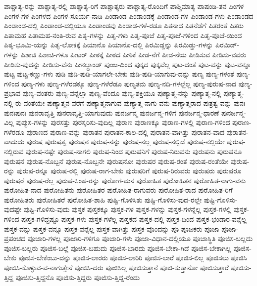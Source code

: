 {ಪಾಶ್ಚಾತ್ಯ-ರನ್ನು
ಪಾಶ್ಚಾತ್ಯ-ರಲ್ಲಿ
ಪಾಶ್ಚಾತ್ಯ-ರಿಗೆ
ಪಾಶ್ಚಾತ್ಯರು
ಪಾಶ್ಚಾತ್ಯ-ರೊಂದಿಗೆ
ಪಾಶ್ಚಿಮಾತ್ಯ
ಪಾಷಂಡಿ-ತನ
ಪಿಂಗಳ
ಪಿಂಗಳ-ಗಳ
ಪಿಂಗಳದ
ಪಿಂಗಳ-ಸೂರ್ಯ-ನಾಡಿ
ಪಿಂಡಾಂಡ
ಪಿಂಡಾಂಡಕ್ಕೆ
ಪಿಂಡಾಂಡ-ಗಳ
ಪಿಂಡಾಂಡ-ಗಳು
ಪಿಂಡಾಂಡದ
ಪಿಂಡಾಂಡ-ದಲ್ಲಿ
ಪಿಂಡಾಂಡ-ದಲ್ಲಿಯೂ
ಪಿಂಡಾಂಡವು
ಪಿಂಡಾಡ-ಗಳೆ-ರಡೂ
ಪಿತನಾದ
ಪಿತನೆಡೆಗೆ
ಪಿತರಂತೆ
ಪಿತರು
ಪಿತಾಮಹ
ಪಿತಾಮಹ-ನಂತಿ-ರುವ
ಪಿತೃ-ಗಳನ್ನು
ಪಿತೃ-ಗಳು
ಪಿತೃ-ಪೂಜೆ
ಪಿತೃ-ಪೂಜೆ-ಗಳಿಂದ
ಪಿತೃ-ಪೂಜೆ-ಯಿಂದ
ಪಿತೃ-ಭೂಮಿ-ಯನ್ನು
ಪಿತೃ-ಲೋಕಕ್ಕೆ
ಪಿಯಾನೊ
ಪಿಯಾನೊ-ದಲ್ಲಿ
ಪಿರಮಿಡ್ಡನ್ನು
ಪಿರಮಿಡ್ಡು-ಗಳನ್ನು
ಪಿರಮಿಡ್-ಗಳನ್ನು
ಪಿಶಾಚಿ
ಪಿಶಾಚಿ-ಗಳೂ
ಪೀಟರ್
ಪೀಠಕ್ಕೆ
ಪೀಠದ
ಪೀಠಿಕೆ
ಪೀಡ-ನೆಗೆ
ಪೀಡ-ನೆಯ
ಪೀಡಿಸುವ
ಪೀಡಿಸು-ವವರು
ಪೀಡಿಸು-ವುದನ್ನು
ಪೀಡಿಸು-ವೆನು
ಪೀನಲ್ಗ್ರಾಂಡ್
ಪುಂಜ-ದಿಂದ
ಪುಕ್ಕದ
ಪುಕ್ಕವೆಲ್ಲ
ಪುಟ-ದಂತೆ
ಪುಟ-ವನ್ನು
ಪುಟ-ವನ್ನೂ
ಪುಟ್ಟ
ಪುಟ್ಟ-ಕಣ್ಣು-ಗಳು
ಪುಡಿ
ಪುಡಿ-ಪುಡಿ-ಯಾಗಲೇ-ಬೇಕು
ಪುಡಿ-ಪುಡಿ-ಯಾಗುವು-ದನ್ನು
ಪುಣ್ಯ
ಪುಣ್ಯ-ಗಳಂತೆ
ಪುಣ್ಯ-ಗಳಿಂದ
ಪುಣ್ಯ-ಗಳು
ಪುಣ್ಯ-ಗಳೆರಡಕ್ಕೂ
ಪುಣ್ಯ-ಗಳೆರೆಡೂ
ಪುಣ್ಯತಮ
ಪುಣ್ಯ-ನದಿ-ಗಳಲ್ಲೆಲ್ಲ
ಪುಣ್ಯ-ಪುರುಷ-ನಾದ
ಪುಣ್ಯ-ಪ್ರಭಾವ
ಪುಣ್ಯ-ವಂತರು
ಪುಣ್ಯ-ವನ್ನೆಲ್ಲಾ
ಪುಣ್ಯ-ವೆಂದೂ
ಪುಣ್ಯ-ಶಕ್ತಿಯೂ
ಪುಣ್ಯಾತ್ಮ-ನನ್ನು
ಪುಣ್ಯಾತ್ಮ-ನಲ್ಲಿ
ಪುಣ್ಯಾತ್ಮ-ನಲ್ಲಿ-ರು-ವಂತೆಯೇ
ಪುಣ್ಯಾತ್ಮನ-ವರೆಗೆ
ಪುಣ್ಯಾತ್ಮನಾಗುವ
ಪುಣ್ಯಾತ್ಮ-ನಾಗು-ವನು
ಪುಣ್ಯಾತ್ಮರಾದ
ಪುತ್ರತ್ವ-ವನ್ನು
ಪುನಃ
ಪುನಃಪುನಃ
ಪುನರಾವೃತ್ತಿ
ಪುನರಾವೃತ್ತಿ-ಯಾಗುವುದು
ಪುನರ್ಜನ್ಮ
ಪುನರ್ಜನ್ಮ-ಗಳಿಗೆ
ಪುನರ್ಜನ್ಮ-ಧಾರಣೆ
ಪುನರ್ಜನ್ಮ-ವಿಲ್ಲ
ಪುಪ್ಪುಸ-ಗಳನ್ನು
ಪುರಸತ್ತು
ಪುರಸ್ಕರಿಸು-ವುದಿಲ್ಲ
ಪುರಾಣ
ಪುರಾಣಕ್ಕೂ
ಪುರಾಣ-ಗಳಲ್ಲಿ
ಪುರಾಣ-ಗಳಿಂದ
ಪುರಾಣ-ಗಳೆರಡೂ
ಪುರಾಣದ
ಪುರಾಣ-ವನ್ನು
ಪುರಾತನ
ಪುರಾತನ-ಕಾಲ-ದಲ್ಲಿ
ಪುರಾತನ-ವಾಗಿತ್ತು
ಪುರಾತನ-ವಾದ
ಪುರಾತನ-ವಾದುದು
ಪುರುಷ
ಪುರುಷತ್ವ
ಪುರುಷನ
ಪುರುಷ-ನನ್ನು
ಪುರುಷ-ನಲ್ಲ
ಪುರುಷ-ನಲ್ಲಿದೆ
ಪುರುಷ-ನಲ್ಲಿಯೇ
ಪುರುಷ-ನಲ್ಲಿರುವ
ಪುರುಷ-ನಷ್ಟೇ
ಪುರುಷ-ನಾಗಲಿ
ಪುರುಷ-ನಿಂದ
ಪುರುಷನಿಗೆ
ಪುರುಷ-ನಿರುವನು
ಪುರುಷನು
ಪುರುಷನೂ
ಪುರುಷನೆ
ಪುರುಷ-ನೊಬ್ಬನೆ
ಪುರುಷ-ನೊಬ್ಬನೇ
ಪುರುಷನೋ
ಪುರುಷರ
ಪುರುಷ-ರಂತೆ
ಪುರುಷ-ರಂತೆಯೇ
ಪುರುಷ-ರನ್ನು
ಪುರುಷ-ರನ್ನೂ
ಪುರುಷ-ರಲ್ಲಿ
ಪುರುಷ-ರಾಗ-ಬೇಕು
ಪುರುಷರಿಗೆ
ಪುರುಷ-ರಿರುವರು
ಪುರುಷರು
ಪುರುಷರೂ
ಪುರುಷರೆ
ಪುರುಷ-ರೆಲ್ಲ
ಪುರುಷ-ಸಿಂಹ-ರನ್ನು
ಪುರೋಗ-ಮನ
ಪುರೋಹಿತ
ಪುರೋಹಿತನ
ಪುರೋಹಿತ-ನಾಗು-ವನು
ಪುರೋಹಿತ-ನಾದ
ಪುರೋಹಿತನು
ಪುರೋಹಿತರ
ಪುರೋಹಿತ-ರಾಗುವರು
ಪುರೋಹಿತ-ರಾದ
ಪುರೋಹಿತ-ರಿಗೆ
ಪುರೋಹಿತರು
ಪುರೋಹಿತರೆ
ಪುರೋಹಿತ-ಶಾಹಿ
ಪುಷ್ಟಿ-ಗೊಳಿಸಿತು
ಪುಷ್ಟಿ-ಗೊಳಿಸು-ವುದ-ರಲ್ಲೇ
ಪುಷ್ಟಿ-ಗೊಳಿಸು-ವುದಷ್ಟೇ
ಪುಷ್ಟಿ-ಗೊಳಿಸು-ವುದು
ಪುಸ್ತಕ
ಪುಸ್ತಕಕ್ಕೂ
ಪುಸ್ತಕ-ಗಳ
ಪುಸ್ತಕ-ಗಳನ್ನು
ಪುಸ್ತಕ-ಗಳನ್ನೆಲ್ಲ
ಪುಸ್ತಕ-ಗಳಲ್ಲಿ
ಪುಸ್ತಕ-ಗಳಿಂದ
ಪುಸ್ತಕ-ಗಳಿದ್ದಷ್ಟೂ
ಪುಸ್ತಕ-ಗಳು
ಪುಸ್ತಕ-ಗಳೆಲ್ಲ
ಪುಸ್ತಕದ
ಪುಸ್ತಕ-ದಲ್ಲಿ
ಪುಸ್ತಕ-ದಿಂದ
ಪುಸ್ತಕ-ಭಂಡಾರ-ವನ್ನೆಲ್ಲ
ಪುಸ್ತಕ-ವನ್ನು
ಪುಸ್ತಕ-ವನ್ನೂ
ಪುಸ್ತಕ-ವನ್ನೆಲ್ಲ
ಪುಸ್ತಕ-ವಾಗಿತ್ತು
ಪುಸ್ತಕ-ವೊಂದನ್ನು
ಪೂ
ಪೂಜಕರು
ಪೂಜಾ
ಪೂಜಾ-ಪ್ರಪಂಚದ
ಪೂಜಾರಿ-ಗಳಲ್ಲ
ಪೂಜಾರಿ-ಗಳಿಗೂ
ಪೂಜಾರಿ-ಗಳು
ಪೂಜಾ-ವಿಧಾನ-ದಲ್ಲಿಯೂ
ಪೂಜಾಸ್ಥಿತಿ
ಪೂಜಿಸ-ಬಲ್ಲದು
ಪೂಜಿಸ-ಬಲ್ಲರು
ಪೂಜಿಸ-ಬಲ್ಲೆ
ಪೂಜಿಸ-ಬಹುದು
ಪೂಜಿಸ-ಬಾರದು
ಪೂಜಿಸ-ಬೇಕಾ-ಗಿದೆ
ಪೂಜಿಸ-ಬೇಕಾಗಿಲ್ಲ
ಪೂಜಿಸ-ಬೇಕು
ಪೂಜಿಸ-ಬೇಕೆಂಬು-ದನ್ನು
ಪೂಜಿಸ-ಲಾರರು
ಪೂಜಿಸ-ಲಾರಿರಿ
ಪೂಜಿಸ-ಲಾರೆ
ಪೂಜಿಸ-ಲಿಲ್ಲ
ಪೂಜಿಸಲು
ಪೂಜಿಸಿ
ಪೂಜಿಸಿ-ಕೊಳ್ಳುವ-ವ-ನಾಗುತ್ತೇನೆ
ಪೂಜಿಸಿ-ದರು
ಪೂಜಿಸಿಲ್ಲ
ಪೂಜಿಸುತ್ತಾನೆ
ಪೂಜಿ-ಸುತ್ತಾನೋ
ಪೂಜಿಸುತ್ತಾರೆ
ಪೂಜಿಸು-ತ್ತಿದ್ದ
ಪೂಜಿಸು-ತ್ತಿದ್ದನೊ
ಪೂಜಿಸು-ತ್ತಿದ್ದರು
ಪೂಜಿಸು-ತ್ತಿದ್ದ-ರೆಂದು
}
